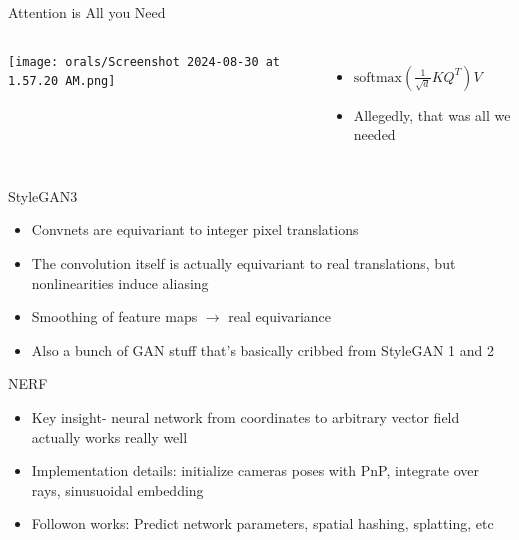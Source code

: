 \documentclass{beamer}
\begin{document}
\begin{frame}{Attention is All you Need}
    \begin{columns}
	    \texttt{[image: orals/Screenshot 2024-08-30 at 1.57.20 AM.png]}
        \begin{itemize}
		\item $\text{softmax}( \frac{1}{\sqrt{d}} K Q^T) V$
		\item Allegedly, that was all we needed
        \end{itemize}
    \end{columns}
\end{frame}

\begin{frame}{StyleGAN3}
	\begin{itemize}
		\item Convnets are equivariant to integer pixel translations
		\item The convolution itself is actually equivariant to real translations, but nonlinearities induce aliasing
		\item Smoothing of feature maps $\rightarrow$ real equivariance
		\item Also a bunch of GAN stuff that's basically cribbed from StyleGAN 1 and 2

	\end{itemize}
\end{frame}
\begin{frame}{NERF}
	\begin{itemize}
		\item Key insight- neural network from coordinates to arbitrary vector field actually works really well
		\item Implementation details: initialize cameras poses with PnP, integrate over rays, sinusuoidal embedding
		\item Followon works: Predict network parameters, spatial hashing, splatting, etc

	\end{itemize}
\end{frame}
\end{document}
